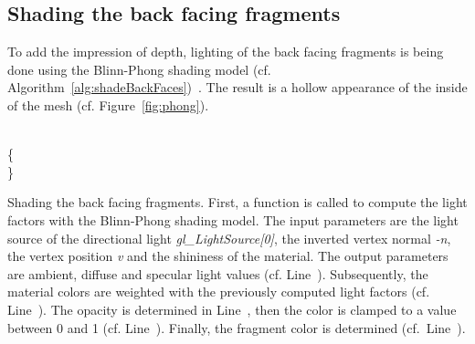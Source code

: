 \subsection{Shading the back facing fragments}
To add the impression of depth, lighting of the back facing fragments is being done using the Blinn-Phong shading model (cf. Algorithm~\ref{alg:shadeBackFaces})~\cite{book:computerGraphicsHearn}. The result is a hollow appearance of the inside of the mesh (cf. Figure~\ref{fig:phong}).
\LinesNumbered
\begin{algorithm}
\\
\{\\
\Indp{}\;
	\;\label{ln:normVN}
	\BlankLine
	\;\label{ln:color}
\Indm\}
\BlankLine
\caption{Shading the back facing fragments. First, a function is called to compute the light factors with the Blinn-Phong shading model. The input parameters are the light source of the directional light \emph{gl\_LightSource[0]}, the inverted vertex normal \emph{-n}, the vertex position \emph{v} and the shininess of the material. The output parameters are ambient, diffuse and specular light values (cf. Line~\NlSty{\ref{ln:bphong}}). Subsequently, the material colors are weighted with the previously computed light factors (cf. Line~\NlSty{\ref{ln:light}}). The opacity is determined in Line~\NlSty{\ref{ln:opacity}}, then the color is clamped to a value between 0 and 1 (cf. Line~\NlSty{\ref{ln:clamp}}). Finally, the fragment color is determined (cf.~Line~\NlSty{\ref{ln:color}}).}
\label{alg:shadeBackFaces}
\end{algorithm}
\LinesNotNumbered

